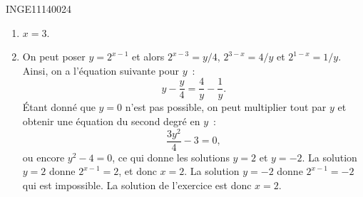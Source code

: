 

\begin{corrige}{INGE11140024}

	\begin{enumerate}

		\item
			$x=3$.
		\item
			On peut poser $y=2^{x-1}$ et alors $2^{x-3}=y/4$, $2^{3-x}=4/y$ et $2^{1-x}=1/y$. Ainsi, on a l'équation suivante pour $y$~:
			\begin{equation}
				y-\frac{ y }{ 4 }=\frac{ 4 }{ y }-\frac{1}{ y }.
			\end{equation}
			Étant donné que $y=0$ n'est pas possible, on peut multiplier tout par $y$ et obtenir une équation du second degré en $y$~:
			\begin{equation}
				\frac{ 3y^2 }{ 4 }-3=0,
			\end{equation}
			ou encore $y^2-4=0$, ce qui donne les solutions $y=2$ et $y=-2$. La solution $y=2$ donne $2^{x-1}=2$, et donc $x=2$. La solution $y=-2$ donne $2^{x-1}=-2$ qui est impossible.  La solution de l'exercice est donc $x=2$.
				

\end{enumerate}
\end{corrige}
